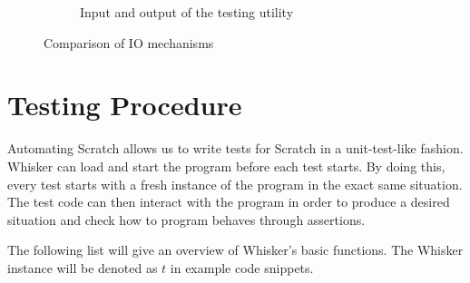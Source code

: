\begin{figure}[h]
\begin{subfigure}[b]{\textwidth}
        \caption{Input and output of the testing utility}
        \label{fig:input_and_output_of_the_testing utility}
    \end{subfigure}

    \caption{Comparison of IO mechanisms}
    \label{fig:comparison_of_io_mechanisms}
\end{figure}

\section{Testing Procedure}

Automating Scratch allows us to write tests for Scratch in a unit-test-like fashion.
Whisker can load and start the program before each test starts.
By doing this, every test starts with a fresh instance of the program in the exact same situation.
The test code can then interact with the program in order to produce a desired situation and check how to program behaves through assertions.

The following list will give an overview of Whisker's basic functions.
The Whisker instance will be denoted as $t$ in example code snippets.


